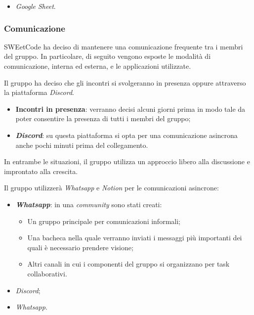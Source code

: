 \documentclass[10pt, a4paper]{article}
\begin{document}
\begin{itemize}
    \item \textit{Google Sheet}.
\end{itemize}

\subsubsection{Comunicazione}
\label{sec:comunicazione}
SWEetCode ha deciso di mantenere una comunicazione frequente tra i membri del gruppo. In particolare, di seguito vengono esposte le modalità di comunicazione, interna ed esterna, e le applicazioni utilizzate.


Il gruppo ha deciso che gli incontri si svolgeranno in presenza oppure attraverso la piattaforma \textit{Discord}.
\begin{itemize}
    \item \textbf{Incontri in presenza}: verranno decisi alcuni giorni prima in modo tale da poter consentire la presenza di tutti i membri del gruppo;
    \item \textbf{\textit{Discord}}: su questa piattaforma si opta per una comunicazione asincrona anche pochi minuti prima del collegamento.
\end{itemize}
 
 In entrambe le situazioni, il gruppo utilizza un approccio libero alla discussione e improntato alla crescita.

Il gruppo utilizzerà \textit{Whatsapp} e \textit{Notion} per le comunicazioni asincrone:
 \begin{itemize}
    \item \textbf{\textit{Whatsapp}}: in una \textit{community} sono stati creati:
    \begin{itemize}
        \item Un gruppo principale per comunicazioni informali;
        \item Una bacheca nella quale verranno inviati i messaggi più importanti dei quali è necessario prendere visione;
        \item Altri canali in cui i componenti del gruppo si organizzano per task collaborativi.
    \end{itemize}
 \end{itemize}


\begin{itemize}
    \item \textit{Discord};
    \item \textit{Whatsapp}.
\end{itemize}
\end{document}
